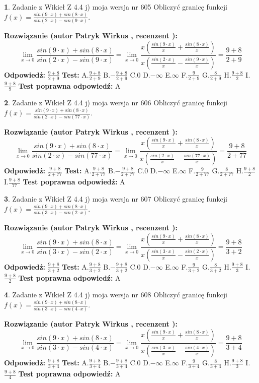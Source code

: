 \documentclass[12pt, a4paper]{article}
\theoremstyle{definition} %
\newtheorem{zad}{}
\newcommand{\zadStart}[1]{\begin{zad}#1\newline}
\newcommand{\zadStop}{\end{zad}}
\newcommand{\rozwStart}[2]{\noindent \textbf{Rozwiązanie (autor #1 , recenzent #2): }\newline}
\newcommand{\rozwStop}{\newline}
\newcommand{\odpStart}{\noindent \textbf{Odpowiedź:}\newline}
\newcommand{\odpStop}{\newline}
\newcommand{\testStart}{\noindent \textbf{Test:}\newline}
\newcommand{\testStop}{\newline}
\newcommand{\kluczStart}{\noindent \textbf{Test poprawna odpowiedź:}\newline}
\newcommand{\kluczStop}{\newline}
\begin{document}
\zadStart{Zadanie z Wikieł Z 4.4 j) moja wersja nr 605}
Obliczyć granicę funkcji $f(x)=\frac{sin(9\cdot x) +sin(8\cdot x)}{sin(2\cdot x) -sin(9\cdot x)}$.
\zadStop
\rozwStart{Patryk Wirkus}{}
$$\lim\limits_{x\to 0}\frac{sin(9\cdot x) +sin(8\cdot x)}{sin(2\cdot x) -sin(9\cdot x)}=\lim\limits_{x\to 0}\frac{x(\frac{sin(9\cdot x)}{x}+\frac{sin(8\cdot x)}{x})}{x(\frac{sin(2\cdot x)}{x}-\frac{sin(9\cdot x)}{x})}=\frac{9+8}{2+9}$$
\rozwStop
\odpStart
$\frac{9+8}{2+9}$
\odpStop
\testStart
A.$\frac{9+8}{2+9}$
B.$-\frac{9+8}{2+9}$
C.$0$
D.$-\infty$
E.$\infty$
F.$\frac{9}{2+9}$
G.$\frac{8}{2+9}$
H.$\frac{9+8}{2}$
I.$\frac{9+8}{9}$
\testStop
\kluczStart
A
\kluczStop



\zadStart{Zadanie z Wikieł Z 4.4 j) moja wersja nr 606}
Obliczyć granicę funkcji $f(x)=\frac{sin(9\cdot x) +sin(8\cdot x)}{sin(2\cdot x) -sin(77\cdot x)}$.
\zadStop
\rozwStart{Patryk Wirkus}{}
$$\lim\limits_{x\to 0}\frac{sin(9\cdot x) +sin(8\cdot x)}{sin(2\cdot x) -sin(77\cdot x)}=\lim\limits_{x\to 0}\frac{x(\frac{sin(9\cdot x)}{x}+\frac{sin(8\cdot x)}{x})}{x(\frac{sin(2\cdot x)}{x}-\frac{sin(77\cdot x)}{x})}=\frac{9+8}{2+77}$$
\rozwStop
\odpStart
$\frac{9+8}{2+77}$
\odpStop
\testStart
A.$\frac{9+8}{2+77}$
B.$-\frac{9+8}{2+77}$
C.$0$
D.$-\infty$
E.$\infty$
F.$\frac{9}{2+77}$
G.$\frac{8}{2+77}$
H.$\frac{9+8}{2}$
I.$\frac{9+8}{77}$
\testStop
\kluczStart
A
\kluczStop



\zadStart{Zadanie z Wikieł Z 4.4 j) moja wersja nr 607}
Obliczyć granicę funkcji $f(x)=\frac{sin(9\cdot x) +sin(8\cdot x)}{sin(3\cdot x) -sin(2\cdot x)}$.
\zadStop
\rozwStart{Patryk Wirkus}{}
$$\lim\limits_{x\to 0}\frac{sin(9\cdot x) +sin(8\cdot x)}{sin(3\cdot x) -sin(2\cdot x)}=\lim\limits_{x\to 0}\frac{x(\frac{sin(9\cdot x)}{x}+\frac{sin(8\cdot x)}{x})}{x(\frac{sin(3\cdot x)}{x}-\frac{sin(2\cdot x)}{x})}=\frac{9+8}{3+2}$$
\rozwStop
\odpStart
$\frac{9+8}{3+2}$
\odpStop
\testStart
A.$\frac{9+8}{3+2}$
B.$-\frac{9+8}{3+2}$
C.$0$
D.$-\infty$
E.$\infty$
F.$\frac{9}{3+2}$
G.$\frac{8}{3+2}$
H.$\frac{9+8}{3}$
I.$\frac{9+8}{2}$
\testStop
\kluczStart
A
\kluczStop



\zadStart{Zadanie z Wikieł Z 4.4 j) moja wersja nr 608}
Obliczyć granicę funkcji $f(x)=\frac{sin(9\cdot x) +sin(8\cdot x)}{sin(3\cdot x) -sin(4\cdot x)}$.
\zadStop
\rozwStart{Patryk Wirkus}{}
$$\lim\limits_{x\to 0}\frac{sin(9\cdot x) +sin(8\cdot x)}{sin(3\cdot x) -sin(4\cdot x)}=\lim\limits_{x\to 0}\frac{x(\frac{sin(9\cdot x)}{x}+\frac{sin(8\cdot x)}{x})}{x(\frac{sin(3\cdot x)}{x}-\frac{sin(4\cdot x)}{x})}=\frac{9+8}{3+4}$$
\rozwStop
\odpStart
$\frac{9+8}{3+4}$
\odpStop
\testStart
A.$\frac{9+8}{3+4}$
B.$-\frac{9+8}{3+4}$
C.$0$
D.$-\infty$
E.$\infty$
F.$\frac{9}{3+4}$
G.$\frac{8}{3+4}$
H.$\frac{9+8}{3}$
I.$\frac{9+8}{4}$
\testStop
\kluczStart
A
\kluczStop
\end{document}
